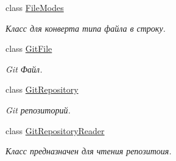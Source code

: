 \begin{DoxyCompactItemize}
class \hyperlink{classcom_1_1selesse_1_1gitwrapper_1_1myobjects_1_1_file_modes}{File\+Modes}
\begin{DoxyCompactList}\small\item\em Класс для конверта типа файла в строку. \end{DoxyCompactList}\item 
class \hyperlink{classcom_1_1selesse_1_1gitwrapper_1_1myobjects_1_1_git_file}{Git\+File}
\begin{DoxyCompactList}\small\item\em Git Файл. \end{DoxyCompactList}\item 
class \hyperlink{classcom_1_1selesse_1_1gitwrapper_1_1myobjects_1_1_git_repository}{Git\+Repository}
\begin{DoxyCompactList}\small\item\em Git репозиторий. \end{DoxyCompactList}\item 
class \hyperlink{classcom_1_1selesse_1_1gitwrapper_1_1myobjects_1_1_git_repository_reader}{Git\+Repository\+Reader}
\begin{DoxyCompactList}\small\item\em Класс предназначен для чтения репозитоия. \end{DoxyCompactList}\end{DoxyCompactItemize}
